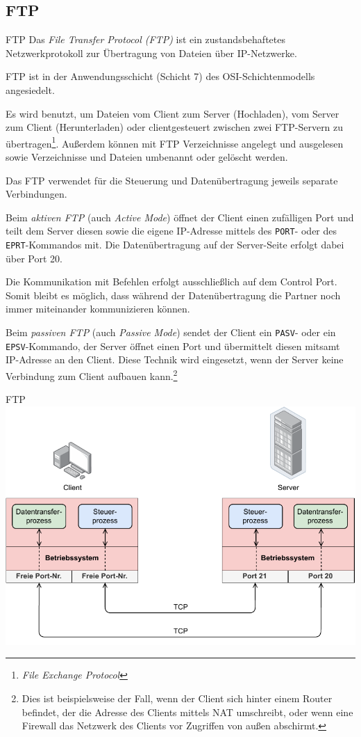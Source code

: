 \subsection{FTP}

\begin{defi}{FTP}
    Das \emph{File Transfer Protocol (FTP)} ist ein zustandsbehaftetes Netzwerkprotokoll zur Übertragung von Dateien über IP-Netzwerke.

    FTP ist in der Anwendungsschicht (Schicht 7) des OSI-Schichtenmodells angesiedelt.

    Es wird benutzt, um Dateien vom Client zum Server (Hochladen), vom Server zum Client (Herunterladen) oder clientgesteuert zwischen zwei FTP-Servern zu übertragen\footnote{\emph{File Exchange Protocol}}.
    Außerdem können mit FTP Verzeichnisse angelegt und ausgelesen sowie Verzeichnisse und Dateien umbenannt oder gelöscht werden.

    Das FTP verwendet für die Steuerung und Datenübertragung jeweils separate Verbindungen.

    Beim \emph{aktiven FTP} (auch \emph{Active Mode}) öffnet der Client einen zufälligen Port und teilt dem Server diesen sowie die eigene IP-Adresse mittels des \texttt{PORT}- oder des \texttt{EPRT}-Kommandos mit.
    Die Datenübertragung auf der Server-Seite erfolgt dabei über Port 20.

    Die Kommunikation mit Befehlen erfolgt ausschließlich auf dem Control Port.
    Somit bleibt es möglich, dass während der Datenübertragung die Partner noch immer miteinander kommunizieren können.

    Beim \emph{passiven FTP} (auch \emph{Passive Mode}) sendet der Client ein \texttt{PASV}- oder ein \texttt{EPSV}-Kommando, der Server öffnet einen Port und übermittelt diesen mitsamt IP-Adresse an den Client.
    Diese Technik wird eingesetzt, wenn der Server keine Verbindung zum Client aufbauen kann.\footnote{Dies ist beispielsweise der Fall, wenn der Client sich hinter einem Router befindet, der die Adresse des Clients mittels NAT umschreibt, oder wenn eine Firewall das Netzwerk des Clients vor Zugriffen von außen abschirmt.}
\end{defi}

\begin{example}{FTP}
    \centering
    \includegraphics[width=.7\textwidth]{includes/figures/example_ftp.pdf}
\end{example}

